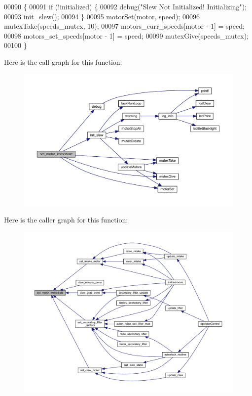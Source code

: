\begin{DoxyCode}
00090                                                \{
00091   \textcolor{keywordflow}{if} (!initialized) \{
00092     debug(\textcolor{stringliteral}{"Slew Not Initialized! Initializing"});
00093     init_slew();
00094   \}
00095   motorSet(motor, speed);
00096   mutexTake(speeds_mutex, 10);
00097   motors_curr_speeds[motor - 1] = speed;
00098   motors_set_speeds[motor - 1] = speed;
00099   mutexGive(speeds_mutex);
00100 \}
\end{DoxyCode}
Here is the call graph for this function\+:
\nopagebreak
\begin{figure}[H]
\begin{center}
\leavevmode
\includegraphics[width=350pt]{slew_8c_a9f8b8ae577ef938622024545711f0151_cgraph}
\end{center}
\end{figure}
Here is the caller graph for this function\+:
\nopagebreak
\begin{figure}[H]
\begin{center}
\leavevmode
\includegraphics[width=350pt]{slew_8c_a9f8b8ae577ef938622024545711f0151_icgraph}
\end{center}
\end{figure}
\mbox{\label{slew_8c_a7dff2b79dffe55fb936d977594d7c01d}} 

